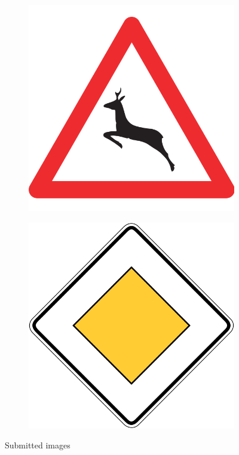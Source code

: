 \begin{figure}[!h]
\begin{subfigure}{.19\linewidth}
\end{subfigure}
\begin{subfigure}{.19\linewidth}
  \centering
  \includegraphics[width=0.7\linewidth]{imgs/16_real}
\end{subfigure}
\begin{subfigure}{.19\linewidth}
  \centering
  \includegraphics[width=0.7\linewidth]{imgs/20_real}
\end{subfigure}
\caption{Submitted images}
\label{fig:test}
\end{figure}

